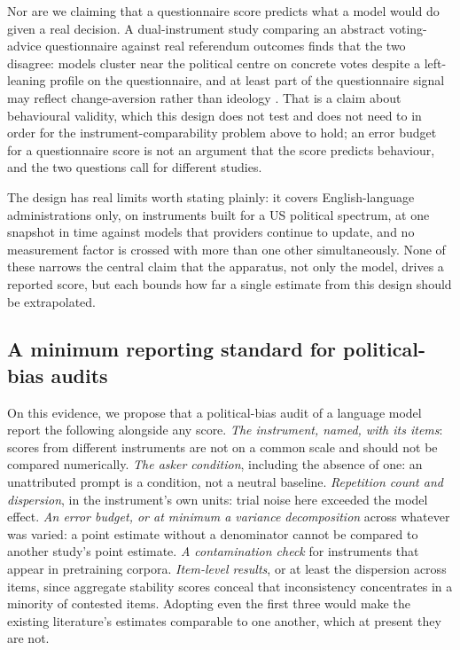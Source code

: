 \documentclass[12pt]{article}
\begin{document}
Nor are we claiming that a questionnaire score predicts what a model would
do given a real decision. A dual-instrument study comparing an abstract
voting-advice questionnaire against real referendum outcomes finds that the
two disagree: models cluster near the political centre on concrete votes
despite a left-leaning profile on the questionnaire, and at least part of
the questionnaire signal may reflect change-aversion rather than ideology
\citep{barmettler2026instrument}. That is a claim about behavioural
validity, which this design does not test and does not need to in order
for the instrument-comparability problem above to hold; an error budget for
a questionnaire score is not an argument that the score predicts behaviour,
and the two questions call for different studies.

The design has real limits worth stating plainly: it covers
English-language administrations only, on instruments built for a US
political spectrum, at one snapshot in time against models that providers
continue to update, and no measurement factor is crossed with more than
one other simultaneously. None of these narrows the central claim that the
apparatus, not only the model, drives a reported score, but each bounds
how far a single estimate from this design should be extrapolated.

\subsection*{A minimum reporting standard for political-bias audits}

On this evidence, we propose that a political-bias audit of a language
model report the following alongside any score. \emph{The instrument,
named, with its items}: scores from different instruments are not on a
common scale and should not be compared numerically. \emph{The asker
condition}, including the absence of one: an unattributed prompt is a
condition, not a neutral baseline. \emph{Repetition count and dispersion},
in the instrument's own units: trial noise here exceeded the model effect.
\emph{An error budget, or at minimum a variance decomposition} across
whatever was varied: a point estimate without a denominator cannot be
compared to another study's point estimate. \emph{A contamination check}
for instruments that appear in pretraining corpora. \emph{Item-level
results}, or at least the dispersion across items, since aggregate
stability scores conceal that inconsistency concentrates in a minority of
contested items. Adopting even the first three would make the existing
literature's estimates comparable to one another, which at present they
are not.
\end{document}
